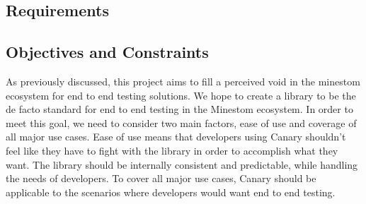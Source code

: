 \documentclass{article}
\begin{document}
\begin{doublespacing}



\section{Requirements}

\subsection{Objectives and Constraints}


As previously discussed, this project aims to fill a perceived void in the minestom ecosystem for end to end testing solutions. We hope to create a library to be the de facto standard for end to end testing in the Minestom ecosystem. In order to meet this goal, we need to consider two main factors, ease of use and coverage of all major use cases. Ease of use means that developers using Canary shouldn’t feel like they have to fight with the library in order to accomplish what they want. The library should be internally consistent and predictable, while handling the needs of developers. To cover all major use cases, Canary should be applicable to the scenarios where developers would want end to end testing.


\end{doublespacing}
\end{document}
